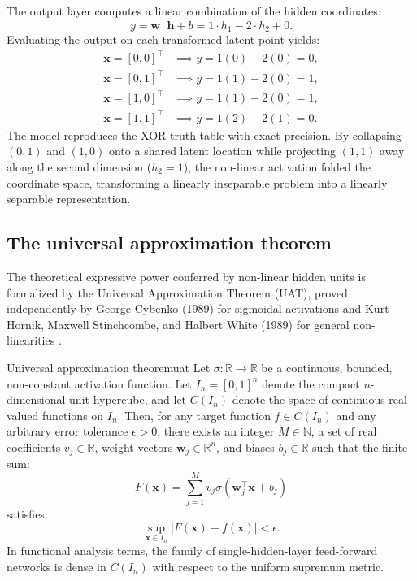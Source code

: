 \documentclass[../../main.tex]{subfiles}
\begin{document}
The output layer computes a linear combination of the hidden coordinates:
\begin{equation}
y = \mathbf{w}^\top \mathbf{h} + b = 1 \cdot h_1 - 2 \cdot h_2 + 0.
\end{equation}
Evaluating the output on each transformed latent point yields:
\begin{align}
\mathbf{x} = [0, 0]^\top &\implies y = 1(0) - 2(0) = 0, \\
\mathbf{x} = [0, 1]^\top &\implies y = 1(1) - 2(0) = 1, \\
\mathbf{x} = [1, 0]^\top &\implies y = 1(1) - 2(0) = 1, \\
\mathbf{x} = [1, 1]^\top &\implies y = 1(2) - 2(1) = 0.
\end{align}
The model reproduces the XOR truth table with exact precision. By collapsing $(0,1)$ and $(1,0)$ onto a shared latent location while projecting $(1,1)$ away along the second dimension ($h_2 = 1$), the non-linear activation folded the coordinate space, transforming a linearly inseparable problem into a linearly separable representation.

\subsection{The universal approximation theorem}
\label{subsec:universal_approximation_theorem}

The theoretical expressive power conferred by non-linear hidden units is formalized by the Universal Approximation Theorem (UAT), proved independently by George Cybenko (1989) for sigmoidal activations \citep{cybenko1989} and Kurt Hornik, Maxwell Stinchcombe, and Halbert White (1989) for general non-linearities \citep{hornik1989}.

\begin{theorem}{Universal approximation theorem}{uat}
Let $\sigma: \mathbb{R} \to \mathbb{R}$ be a continuous, bounded, non-constant activation function. Let $I_n = [0, 1]^n$ denote the compact $n$-dimensional unit hypercube, and let $C(I_n)$ denote the space of continuous real-valued functions on $I_n$. Then, for any target function $f \in C(I_n)$ and any arbitrary error tolerance $\epsilon > 0$, there exists an integer $M \in \mathbb{N}$, a set of real coefficients $v_j \in \mathbb{R}$, weight vectors $\mathbf{w}_j \in \mathbb{R}^n$, and biases $b_j \in \mathbb{R}$ such that the finite sum:
\begin{equation}
F(\mathbf{x}) = \sum_{j=1}^M v_j \sigma\left(\mathbf{w}_j^\top \mathbf{x} + b_j\right)
\end{equation}
satisfies:
\begin{equation}
\sup_{\mathbf{x} \in I_n} \left| F(\mathbf{x}) - f(\mathbf{x}) \right| < \epsilon.
\end{equation}
In functional analysis terms, the family of single-hidden-layer feed-forward networks is dense in $C(I_n)$ with respect to the uniform supremum metric.
\end{theorem}
\end{document}
